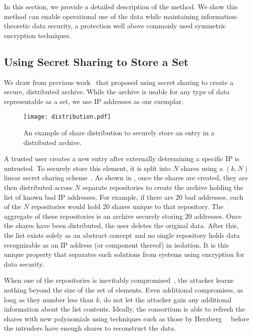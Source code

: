 

In this section, we provide a detailed description of the \SIFlong
method.  We show this method can enable operational use of the data
while maintaining information-theoretic data security, a protection
well above commonly used symmetric encryption techniques.

\subsection{Using Secret Sharing to Store a Set}
\label{ssec:background:set}

We draw from previous work~\cite{Ganger2001,Subbiah2005,Storer2009,Kroeger2013}
that proposed using secret sharing to create a secure, distributed
archive.  While the archive is usable for any type of data representable as a set, 
we use IP addresses as our exemplar.

\begin{figure}[t]
\begin{center}
\begin{adjustbox}{max totalsize={0.95\columnwidth}{0.95\columnwidth},center}
\texttt{[image: distribution.pdf]}
\end{adjustbox}
 \end{center}
\caption{An example of share distribution to securely store an entry in a distributed archive.}
\label{fig:createList}
\end{figure}

A trusted user creates a new entry after externally determining a specific
IP is untrusted.  To securely store this element, it is split into $N$
shares using a $(k,N)$ linear secret sharing scheme~\cite{Shamir1979}.
As shown in , once the shares are created, they
are then distributed across $N$ separate repositories to create the
archive holding the list of known bad IP addresses.  For example,
if there are 20 bad addresses, each of the $N$ repositories would hold
20 shares unique to that repository.  The aggregate of these repositories
is an archive securely
storing 20 addresses. Once the shares have been distributed, the
user deletes the original data.  After this, the list exists solely as an abstract
concept and no single repository holds data recognizable as an
IP address (or component thereof) in isolation.  It is this unique
property that separates such solutions from systems using encryption
for data security.

When one of the repositories is inevitably compromised~\cite{Zaichkowsky2013}, 
the attacker learns nothing beyond the size of the set of elements.  Even additional 
compromises, as long as they number less than $k$, do not let the attacker 
gain any additional information about the list contents. Ideally, the 
consortium is able to refresh the shares with new polynomials using 
techniques such as those by Herzberg~\etal~\cite{Herzberg1995} before the 
intruders have enough shares to reconstruct the data.

